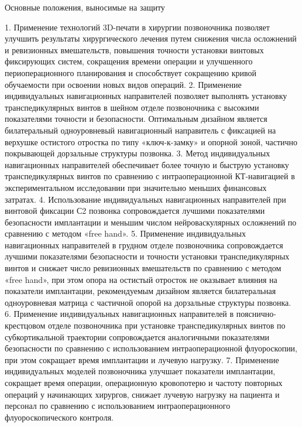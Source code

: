 
Основные положения, выносимые на защиту


     1.    Применение    технологий    3D-печати   в   хирургии   позвоночника
позволяет улучшить результаты хирургического лечения путем снижения числа
осложнений и ревизионных вмешательств, повышения точности установки
винтовых фиксирующих систем, сокращения времени операции и улучшенного
периоперационного    планирования      и   способствует   сокращению   кривой
обучаемости при освоении новых видов операций.
     2.    Применение индивидуальных навигационных направителей позволяет
выполнять установку транспедикулярных винтов в шейном отделе позвоночника
с высокими показателями точности и безопасности. Оптимальным дизайном
является билатеральный одноуровневый навигационный направитель с фиксацией
на верхушке остистого отростка по типу «ключ-к-замку» и опорной зоной,
частично покрывающей дорзальные структуры позвонка.
     3.    Метод индивидуальных навигационных направителей обеспечивает
более точную и быструю установку транспедикулярных винтов по сравнению с
интраоперационной КТ-навигацией в экспериментальном исследовании при
значительно меньших финансовых затратах.
     4.    Использование индивидуальных навигационных направителей при
винтовой фиксации С2 позвонка сопровождается лучшими показателями
безопасности имплантации и меньшим числом нейроваскулярных осложнений по
сравнению с методом «free hand».
     5.    Применение индивидуальных навигационных направителей в грудном
отделе позвоночника сопровождается лучшими показателями безопасности и
точности установки транспедикулярных винтов и снижает число ревизионных
вмешательств по сравнению с методом «free hand», при этом опора на остистый
отросток не оказывает влияния на показатели имплантации, рекомендуемым
дизайном является билатеральная одноуровневая матрица с частичной опорой на
дорзальные структуры позвонка.
     6.      Применение       индивидуальных        навигационных       направителей     в
пояснично-крестцовом отделе позвоночника при установке транспедикулярных
винтов     по     субкортикальной      траектории    сопровождается           аналогичными
показателями безопасности по сравнению с использованием интраоперационной
флуороскопии, при этом сокращает время имплантации и лучевую нагрузку.
     7.      Применение       индивидуальных       моделей   позвоночника         улучшает
показатели имплантации, сокращает время операции, операционную кровопотерю
и частоту повторных операций у начинающих хирургов, снижает лучевую
нагрузку     на    пациента     и   персонал   по    сравнению      с    использованием
интраоперационного флуороскопического контроля.


